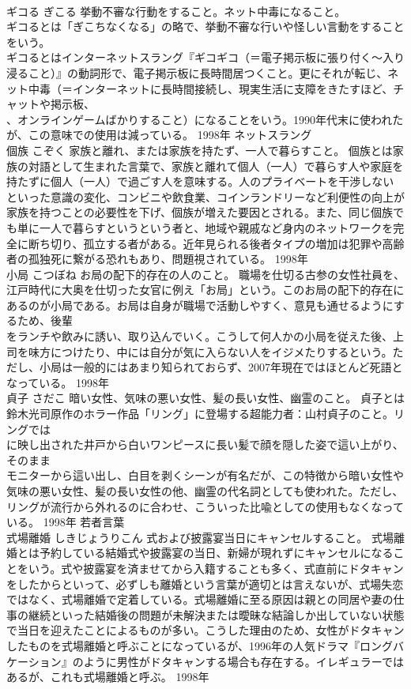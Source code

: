 \documentclass[8pt]{extreport}
\begin{document}
\begin{CJK}{UTF8}{min}
\\	ギコる	ぎこる	挙動不審な行動をすること。ネット中毒になること。	
\\	ギコるとは「ぎこちなくなる」の略で、挙動不審な行いや怪しい言動をすることをいう。 
\\	ギコるとはインターネットスラング『ギコギコ（＝電子掲示板に張り付く～入り浸ること）』の動詞形で、電子掲示板に長時間居つくこと。更にそれが転じ、ネット中毒（＝インターネットに長時間接続し、現実生活に支障をきたすほど、チャットや掲示板、
\\	、オンラインゲームばかりすること）になることをいう。1990年代末に使われたが、この意味での使用は減っている。	1998年	ネットスラング	
\\	個族	こぞく	家族と離れ、または家族を持たず、一人で暮らすこと。	個族とは家族の対語として生まれた言葉で、家族と離れて個人（一人）で暮らす人や家庭を持たずに個人（一人）で過ごす人を意味する。人のプライベートを干渉しないといった意識の変化、コンビニや飲食業、コインランドリーなど利便性の向上が家族を持つことの必要性を下げ、個族が増えた要因とされる。また、同じ個族でも単に一人で暮らすというという者と、地域や親戚など身内のネットワークを完全に断ち切り、孤立する者がある。近年見られる後者タイプの増加は犯罪や高齢者の孤独死に繋がる恐れもあり、問題視されている。	1998年	
\\	小局	こつぼね	お局の配下的存在の人のこと。	職場を仕切る古参の女性社員を、江戸時代に大奥を仕切った女官に例え「お局」という。このお局の配下的存在にあるのが小局である。お局は自身が職場で活動しやすく、意見も通せるようにするため、後輩
\\	をランチや飲みに誘い、取り込んでいく。こうして何人かの小局を従えた後、上司を味方につけたり、中には自分が気に入らない人をイジメたりするという。ただし、小局は一般的にはあまり知られておらず、2007年現在ではほとんど死語となっている。	1998年	
\\	貞子	さだこ	暗い女性、気味の悪い女性、髪の長い女性、幽霊のこと。	貞子とは鈴木光司原作のホラー作品「リング」に登場する超能力者：山村貞子のこと。リングでは
\\	に映し出された井戸から白いワンピースに長い髪で顔を隠した姿で這い上がり、そのまま
\\	モニターから這い出し、白目を剥くシーンが有名だが、この特徴から暗い女性や気味の悪い女性、髪の長い女性の他、幽霊の代名詞としても使われた。ただし、リングが流行から外れるのに合わせ、こういった比喩としての使用もなくなっている。	1998年	若者言葉	
\\	式場離婚	しきじょうりこん	式および披露宴当日にキャンセルすること。	式場離婚とは予約している結婚式や披露宴の当日、新婦が現れずにキャンセルになることをいう。式や披露宴を済ませてから入籍することも多く、式直前にドタキャンをしたからといって、必ずしも離婚という言葉が適切とは言えないが、式場失恋ではなく、式場離婚で定着している。式場離婚に至る原因は親との同居や妻の仕事の継続といった結婚後の問題が未解決または曖昧な結論しか出していない状態で当日を迎えたことによるものが多い。こうした理由のため、女性がドタキャンしたものを式場離婚と呼ぶことになっているが、1996年の人気ドラマ『ロングバケーション』のように男性がドタキャンする場合も存在する。イレギュラーではあるが、これも式場離婚と呼ぶ。	1998年	

\end{CJK}
\end{document}
